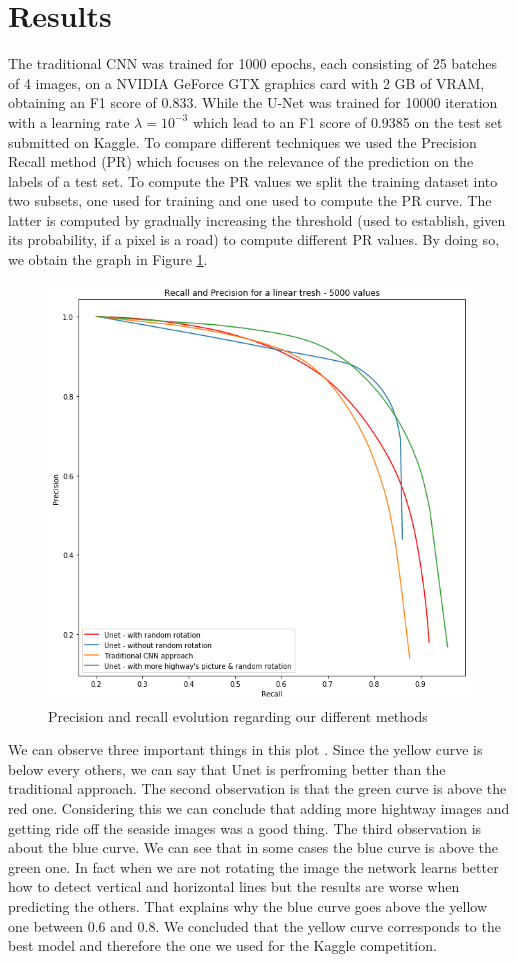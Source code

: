 \documentclass[10pt,conference,compsocconf]{IEEEtran}
\begin{document}
\section{Results}
\label{sec:results}

	The traditional CNN was trained for 1000 epochs, each consisting of 25 batches of 4 images, on a NVIDIA GeForce GTX graphics card with 2 GB of VRAM, obtaining an F1 score of 0.833. While the U-Net was trained for 10000 iteration with a learning rate $\lambda = 10^{-3}$ which lead to an F1 score of 0.9385 on the test set submitted on Kaggle.
	To compare different techniques we used the Precision Recall method (PR) which focuses on the relevance of the prediction on the labels of a test set. To compute the PR values we split the training dataset into two subsets, one used for training and one used to compute the PR curve. The latter is computed by gradually increasing the threshold (used to establish, given its probability, if a pixel is a road) to compute different PR values. By doing so, we obtain the graph in Figure \ref{fig:pr}.

	\begin{figure}[h]
		\centering
		\includegraphics[width=0.8\columnwidth]{img/pr_curve.png}
		\caption{Precision and recall evolution regarding our different methods}
		\label{fig:pr}
	\end{figure}
	
	We can observe three important things in this plot . Since the yellow curve is below every others, we can say that Unet is perfroming better than the traditional approach. The second observation is that the green curve is above the red one. Considering this we can conclude that adding more hightway images and getting ride off the seaside images was a good thing. The third observation is about the blue curve. We can see that in some cases the blue curve is above the green one. In fact when we are not rotating the image the network learns better how to detect vertical and horizontal lines but the results are worse when predicting the others. That explains why the blue curve goes above the yellow one between 0.6 and 0.8. We concluded that the yellow curve corresponds to the best model and therefore the one we used for the Kaggle competition.
	
\end{document}
